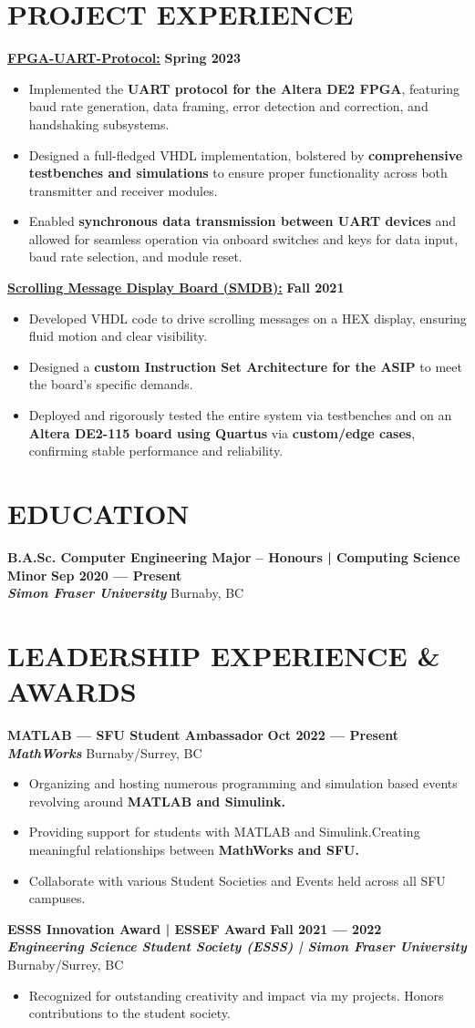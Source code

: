 \documentclass[letterpaper,11pt]{article}
\newcommand{\Item} [1] {
    \item\small{{#1 \vspace{-2pt}}}
}
\newcommand{\employer} [5] {
    {\textbf{#3} \hfill \textbf{#4 --- #5}\\ \textbf{\emph{#1}} \hfill #2\\}
}
\newcommand{\school} [6] {
    {\textbf{#3 | #4} \hfill \textbf{#5 --- #6}\\ \textbf{\emph{#1}} \hfill #2\\}
}
\newcommand{\workItemListStart} [0] {
    \vspace{-1pt}
    \begin{itemize}[topsep=0pt,itemsep=-2pt]
}
\newcommand{\workItemListEnd} [0] {
    \end{itemize}
    \vspace{1pt}
}
\newcommand{\resumeItemListStart} [0] {
    \vspace{2pt}
    \begin{itemize}[topsep=0pt,itemsep=-2pt]
}
\newcommand{\resumeItemListEnd} [0] {
    \end{itemize}
    \vspace{5pt}
}
\begin{document}
    \section{PROJECT EXPERIENCE}
    \href{https://github.com/SatireSage/FPGA-UART-Protocol}{{\color{colorValue}} \underline{\textbf{FPGA-UART-Protocol:}}} \hfill \textbf{Spring 2023}
    \resumeItemListStart{}
        \Item{Implemented the \textbf{UART protocol for the Altera DE2 FPGA}, featuring baud rate generation, data framing, error detection and correction, and handshaking subsystems.}
        \Item{Designed a full-fledged VHDL implementation, bolstered by \textbf{comprehensive testbenches and simulations} to ensure proper functionality across both transmitter and receiver modules.}
        \Item{Enabled \textbf{synchronous data transmission between UART devices} and allowed for seamless operation via onboard switches and keys for data input, baud rate selection, and module reset.}
    \resumeItemListEnd{}
    \href{https://github.com/SatireSage/Scrolling-Message-Display-Board}{{\color{colorValue}} \underline{\textbf{Scrolling Message Display Board (SMDB):}}} \hfill \textbf{Fall 2021}
    \resumeItemListStart{}
        \Item{Developed VHDL code to drive scrolling messages on a HEX display, ensuring fluid motion and clear visibility.}
        \Item{Designed a \textbf{custom Instruction Set Architecture for the ASIP} to meet the board's specific demands.}
        \Item{Deployed and rigorously tested the entire system via testbenches and on an \textbf{Altera DE2-115 board using Quartus} via \textbf{custom/edge cases}, confirming stable performance and reliability.}
    \resumeItemListEnd{}

    \section{EDUCATION}
    \school{Simon Fraser University}{Burnaby, BC}{B.A.Sc. Computer Engineering Major -- Honours}{Computing Science Minor}{Sep 2020}{Present}

    \section{LEADERSHIP EXPERIENCE \& AWARDS}
    \employer{MathWorks}{Burnaby/Surrey, BC}{MATLAB --- SFU Student Ambassador}{Oct 2022}{Present}
    \workItemListStart{}
        \Item{Organizing and hosting numerous programming and simulation based events revolving around \textbf{MATLAB and Simulink.}}
        \Item{Providing support for students with MATLAB and Simulink.\@ Creating meaningful relationships between \textbf{MathWorks and SFU.}}
        \Item{Collaborate with various Student Societies and Events held across all SFU campuses.}
    \workItemListEnd{}
    \employer{Engineering Science Student Society (ESSS) | Simon Fraser University}{Burnaby/Surrey, BC}{ESSS Innovation Award | ESSEF Award}{Fall 2021}{2022}
    \workItemListStart{}
        \Item{Recognized for outstanding creativity and impact via my projects. Honors contributions to the student society.}
    \workItemListEnd{}
\end{document}
